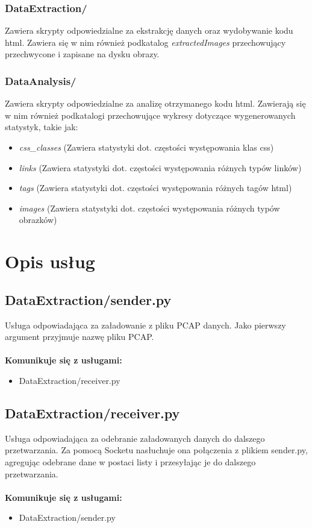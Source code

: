 \documentclass[12pt]{article}
\begin{document}
\subsubsection{DataExtraction/}
Zawiera skrypty odpowiedzialne za ekstrakcję danych oraz wydobywanie kodu html. Zawiera się w nim również podkatalog \emph{extractedImages} przechowujący przechwycone i zapisane na dysku obrazy.
\subsubsection{DataAnalysis/}
Zawiera skrypty odpowiedzialne za analizę otrzymanego kodu html. 
Zawierają się w nim również podkatalogi przechowujące wykresy dotyczące wygenerowanych statystyk, takie jak: 
\begin{itemize}
\item \emph{css\_classes} (Zawiera statystyki dot. częstości występowania klas css)
\item \emph{links}  (Zawiera statystyki dot. częstości występowania różnych typów linków)
\item  \emph{tags}  (Zawiera statystyki dot. częstości występowania różnych tagów html)
\item  \emph{images}  (Zawiera statystyki dot. częstości występowania różnych typów obrazków)
\end{itemize}  
\section{Opis usług}
\subsection{DataExtraction/sender.py}
Usługa odpowiadająca za załadowanie z pliku PCAP danych. Jako pierwszy argument przyjmuje nazwę pliku PCAP. 
\mbox{}\\\\
\textbf{Komunikuje się z usługami:}\\
\begin{itemize}
\item DataExtraction/receiver.py
\end{itemize} 

\subsection{DataExtraction/receiver.py}
Usługa odpowiadająca za odebranie załadowanych danych do dalszego przetwarzania. Za pomocą Socketu nasłuchuje ona połączenia z plikiem sender.py, agregując odebrane dane w postaci listy i przesyłając je do dalszego przetwarzania.
\mbox{}\\\\
\textbf{Komunikuje się z usługami:}\\
\begin{itemize}
\item DataExtraction/sender.py
\end{itemize} 
\end{document}
